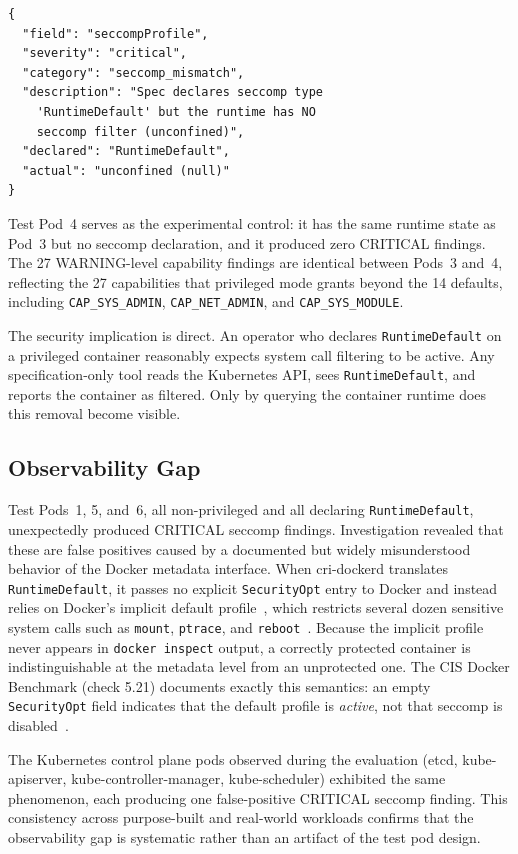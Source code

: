 \documentclass[conference]{IEEEtran}
\begin{document}
\begin{lstlisting}
{
  "field": "seccompProfile",
  "severity": "critical",
  "category": "seccomp_mismatch",
  "description": "Spec declares seccomp type
    'RuntimeDefault' but the runtime has NO
    seccomp filter (unconfined)",
  "declared": "RuntimeDefault",
  "actual": "unconfined (null)"
}
\end{lstlisting}

Test Pod~4 serves as the experimental control: it has the same runtime state as Pod~3 but no seccomp declaration, and it produced zero CRITICAL findings. The 27 WARNING-level capability findings are identical between Pods~3 and~4, reflecting the 27 capabilities that privileged mode grants beyond the 14 defaults, including \texttt{CAP\_SYS\_ADMIN}, \texttt{CAP\_NET\_ADMIN}, and \texttt{CAP\_SYS\_MODULE}.

The security implication is direct. An operator who declares \texttt{RuntimeDefault} on a privileged container reasonably expects system call filtering to be active. Any specification-only tool reads the Kubernetes API, sees \texttt{RuntimeDefault}, and reports the container as filtered. Only by querying the container runtime does this removal become visible.

\subsection{Observability Gap}
\label{sec:obsgap}

Test Pods~1, 5, and~6, all non-privileged and all declaring \texttt{RuntimeDefault}, unexpectedly produced CRITICAL seccomp findings. Investigation revealed that these are false positives caused by a documented but widely misunderstood behavior of the Docker metadata interface. When cri-dockerd translates \texttt{RuntimeDefault}, it passes no explicit \texttt{SecurityOpt} entry to Docker and instead relies on Docker's implicit default profile~\cite{dockerseccomp2024}, which restricts several dozen sensitive system calls such as \texttt{mount}, \texttt{ptrace}, and \texttt{reboot}~\cite{datadog2023}. Because the implicit profile never appears in \texttt{docker inspect} output, a correctly protected container is indistinguishable at the metadata level from an unprotected one. The CIS Docker Benchmark (check 5.21) documents exactly this semantics: an empty \texttt{SecurityOpt} field indicates that the default profile is \emph{active}, not that seccomp is disabled~\cite{cisdocker2024, moric2025}.

The Kubernetes control plane pods observed during the evaluation (etcd, kube-apiserver, kube-controller-manager, kube-scheduler) exhibited the same phenomenon, each producing one false-positive CRITICAL seccomp finding. This consistency across purpose-built and real-world workloads confirms that the observability gap is systematic rather than an artifact of the test pod design.
\end{document}
